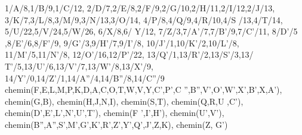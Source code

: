    \begin{center}
            {1/A/8,1/B/9,1/C/12,
            2/D/7,2/E/8,2/F/9,2/G/10,2/H/11,2/I/12,2/J/13,
            3/K/7,3/L/8,3/M/9,3/N/13,3/O/14,
            4/P/8,4/Q/9,4/R/10,4/S /13,4/T/14,
            5/U/22,5/V/24,5/W/26,
            6/X/8,6/ Y/12,
            7/Z/3,7/A'/7,7/B'/9,7/C'/11,
            8/D'/5 ,8/E'/6,8/F'/9,
            9/G'/3,9/H'/7,9/I'/8,
            10/J'/1,10/K'/2,10/L'/8,
            11/M'/5,11/N'/8,
            12/O'/16,12/P'/22,
            13/Q'/1,13/R'/2,13/S'/3,13/ T'/5,13/U'/6,13/V'/7,13/W'/8,13/X'/9,
            14/Y'/0,14/Z'/1,14/A''/4,14/B''/8,14/C''/9}
            {chemin(F,E,L,M,P,K,D,A,C,O,T,W,V,Y,C',P',C '',B'',V',O',W',X',B',X,A'),
            chemin(G,B),
            chemin(H,J,N,I),
            chemin(S,T),
            chemin(Q,R,U ,C'),
            chemin(D',E',L',N',U',T'),
            chemin(F ',I',H'),
            chemin(U',V'),
            chemin(B'',A'',S',M',G',K',R',Z',Y',Q',J',Z,K),
            chemin(Z, G')}
    \end{center}

\vfill
\pagebreak




